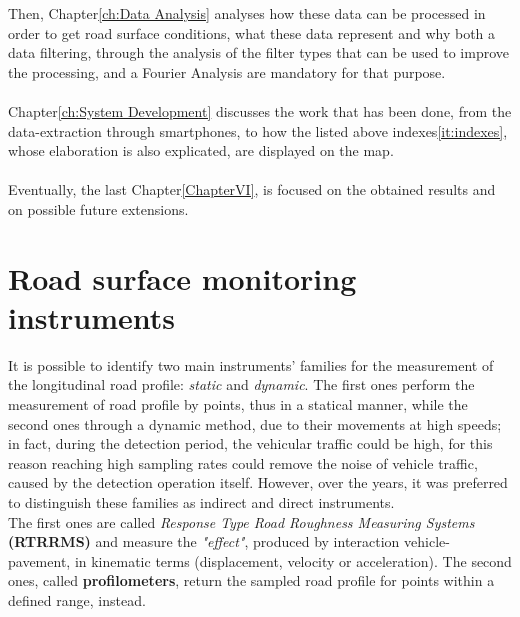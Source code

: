 \documentclass[tesi]{subfiles}
\begin{document}
Then, Chapter\ref{ch:Data Analysis} analyses  how these data can be processed in order to get road surface conditions, what these data represent and why both a data filtering, through the analysis of the filter types that can be used to improve the processing, and a Fourier Analysis are mandatory for that purpose.\\\\
Chapter\ref{ch:System Development} discusses the work that has been done, from the data-extraction through smartphones, to how the listed above indexes\ref{it:indexes}, whose elaboration is also explicated, are displayed on the map.\\\\
Eventually, the last Chapter\ref{ChapterVI}, is focused on the obtained results and on possible future extensions.
\clearpage
	\section{Road surface monitoring instruments}\label{sc:Instruments}
\noindent It is possible to identify two main instruments' families for the measurement of the longitudinal road profile: \emph{static} and \emph{dynamic}. The first ones perform the measurement of road profile by points, thus in a statical manner, while the second ones through a dynamic method, due to their movements at high speeds; in fact, during the detection period, the vehicular traffic could be high, for this reason reaching high sampling rates could remove the noise of vehicle traffic, caused by the detection operation itself. However, over the years, it was preferred to distinguish these families as indirect and direct instruments.\\ The first ones are called \textit{Response Type Road Roughness Measuring Systems} \textbf{(RTRRMS)} and measure the \textit{"effect"}, produced by interaction vehicle-pavement, in kinematic terms (displacement, velocity or acceleration). The second ones, called \textbf{profilometers}, return the sampled road profile for points within a defined range, instead.
\end{document}
